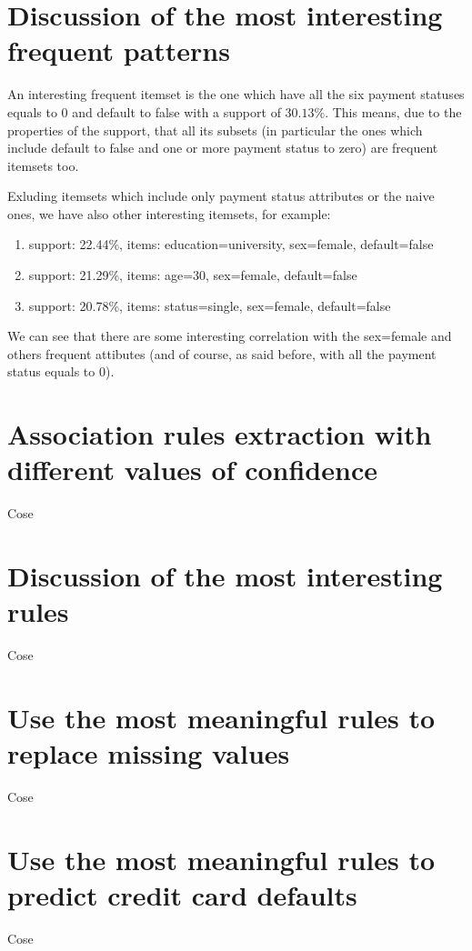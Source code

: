 \section{Discussion of the most interesting frequent patterns}

An interesting frequent itemset is the one which have all the six payment statuses equals to $0$ and default to false with a support of $30.13\%$. This means, due to the properties of the support, that all its subsets (in particular the ones which include default to false and one or more payment status to zero) are frequent itemsets too.

\smallskip

Exluding itemsets which include only payment status attributes or the naive ones, we have also other interesting itemsets, for example:

\begin{enumerate}
  \item support: 22.44\%, items: education=university, sex=female, default=false
  \item support: 21.29\%, items: age=30, sex=female, default=false
  \item support: 20.78\%, items: status=single, sex=female, default=false
\end{enumerate}

We can see that there are some interesting correlation with the sex=female and others frequent attibutes (and of course, as said before, with all the payment status equals to 0).

\section{Association rules extraction with different values of confidence}

Cose

\section{Discussion of the most interesting rules}

Cose

\section{Use the most meaningful rules to replace missing values}

Cose

\section{Use the most meaningful rules to predict credit card defaults}

Cose
